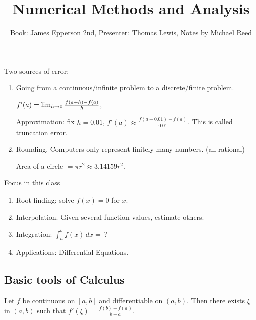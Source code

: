 \documentclass[]{article}
\author{Book: James Epperson 2nd, Presenter: Thomas Lewis, Notes by Michael Reed}
\title{Numerical Methods and Analysis}
\begin{document}
\maketitle



Two sources of error:
\begin{enumerate}
	\item Going from a continuous/infinite problem to a discrete/finite problem.
		\begin{example}
			$f'(a) = \lim_{h\rightarrow0} \frac{f(a+h)-f(a)}{h}$, 
			
			Approximation: fix $h=0.01$, $f'(a)\approx \frac{f(a+0.01)-f(a)}{0.01}$. This is called \ul{truncation error}.
		\end{example}
	\item Rounding. Computers only represent finitely many numbers. (all rational)
		\begin{example}
			Area of a circle $ = \pi r^2 \approx 3.14159r^2$.
		\end{example}
\end{enumerate}

\ul{Focus in this class}
\begin{enumerate}
	\item Root finding: solve $f(x)=0$ for $x$.
	\item Interpolation. Given several function values, estimate others.
	\item Integration: $\int_a^b f(x)\,dx =\ ?$
	\item Applications: Differential Equations.
\end{enumerate}

\subsection*{Basic tools of Calculus}

\begin{theorem}
	Let $f$ be continuous on $[a,b]$ and differentiable on $(a,b)$. Then there exists $\xi$ in $(a,b)$ such that $f'(\xi)=\frac{f(b)-f(a)}{b-a}$.
\end{theorem}
\end{document}
